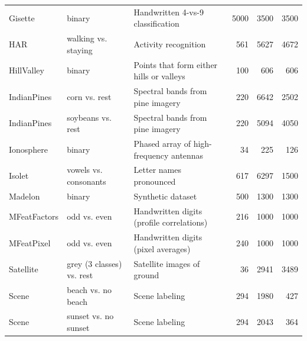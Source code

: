 \begin{table}[hbtp]
\begin{tabular}{p{2.5cm}p{3.5cm}p{5.2cm}rrr}
      Gisette  \cite{guyon2004result}                            & binary                    & Handwritten 4-vs-9 classification         & 5000      & 3500      & 3500      \\
      HAR \cite{anguita2013public}                               & walking vs. staying       & Activity recognition                      & 561       & 5627      & 4672      \\
      HillValley \cite{Dua:2019}                                 & binary                    & Points that form either hills or valleys  & 100       & 606       & 606       \\
      IndianPines \cite{PURR1947}                                & corn vs. rest             & Spectral bands from pine imagery          & 220       & 6642      & 2502      \\
      IndianPines \cite{PURR1947}                                & soybeans vs. rest         & Spectral bands from pine imagery          & 220       & 5094      & 4050      \\
      Ionosphere \cite{sigillito1989classification}              & binary                    & Phased array of high-frequency antennas   & 34        & 225       & 126       \\
      Isolet \cite{fanty1990spoken}                              & vowels vs. consonants     & Letter names pronounced                   & 617       & 6297      & 1500      \\
      Madelon \cite{guyon2004result}                             & binary                    & Synthetic dataset                         & 500       & 1300      & 1300      \\
      MFeatFactors\cite{jain2000statistical}                     & odd vs. even              & Handwritten digits (profile correlations) & 216       & 1000      & 1000      \\
      MFeatPixel                                                 & odd vs. even              & Handwritten digits (pixel averages)       & 240       & 1000      & 1000      \\
      Satellite \cite{goldstein2016comparative}                  & grey (3 classes) vs. rest & Satellite images of ground                & 36        & 2941      & 3489      \\
      Scene \cite{boutell2004learning}                           & beach vs. no beach        & Scene labeling                            & 294       & 1980      & 427       \\
      Scene \cite{boutell2004learning}                           & sunset vs. no sunset      & Scene labeling                            & 294       & 2043      & 364       \\

\end{tabular}
\end{table}
